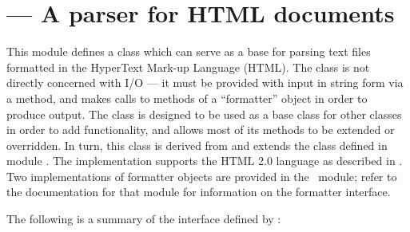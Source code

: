 \section{ ---
         A parser for HTML documents}




This module defines a class which can serve as a base for parsing text
files formatted in the HyperText Mark-up Language (HTML).  The class
is not directly concerned with I/O --- it must be provided with input
in string form via a method, and makes calls to methods of a
``formatter'' object in order to produce output.  The
 class is designed to be used as a base class for
other classes in order to add functionality, and allows most of its
methods to be extended or overridden.  In turn, this class is derived
from and extends the  class defined in module
.  The 
implementation supports the HTML 2.0 language as described in
.  Two implementations of formatter objects are provided in
the \ module; refer to the
documentation for that module for information on the formatter
interface.

The following is a summary of the interface defined by
:


